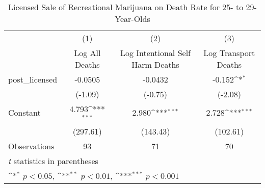 \begin{table}[htbp]\centering
\def\sym#1{\ifmmode^{#1}\else\(^{#1}\)\fi}
\caption{Licensed Sale of Recreational Marijuana on Death Rate for 25- to 29-Year-Olds}
\begin{tabular}{l*{3}{c}}
\hline\hline
                    &\multicolumn{1}{c}{(1)}&\multicolumn{1}{c}{(2)}&\multicolumn{1}{c}{(3)}\\
                    &\multicolumn{1}{c}{Log All Deaths}&\multicolumn{1}{c}{Log Intentional Self Harm Deaths}&\multicolumn{1}{c}{Log Transport Deaths}\\
\hline
post\_licensed       &     -0.0505         &     -0.0432         &      -0.152\sym{*}  \\
                    &     (-1.09)         &     (-0.75)         &     (-2.08)         \\
[1em]
Constant            &       4.793\sym{***}&       2.980\sym{***}&       2.728\sym{***}\\
                    &    (297.61)         &    (143.43)         &    (102.61)         \\
\hline
Observations        &          93         &          71         &          70         \\
\hline\hline
\multicolumn{4}{l}{\footnotesize \textit{t} statistics in parentheses}\\
\multicolumn{4}{l}{\footnotesize \sym{*} \(p<0.05\), \sym{**} \(p<0.01\), \sym{***} \(p<0.001\)}\\
\end{tabular}
\end{table}
